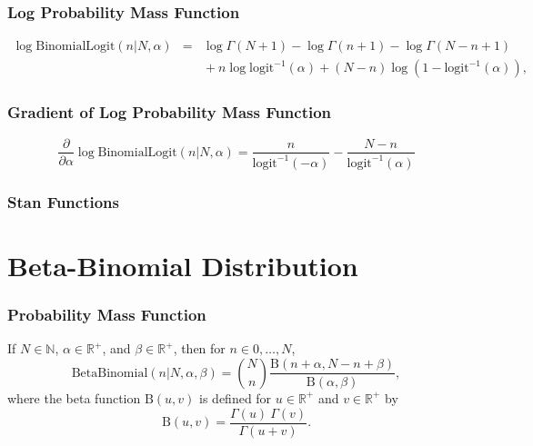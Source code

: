 \begin{description}
\subsubsection{Log Probability Mass Function}

\begin{eqnarray*} \log \text{BinomialLogit}(n|N,\alpha) & = & \log \Gamma(N+1) - \log \Gamma(n + 1) - \log \Gamma(N- n + 1) \\[4pt]   & &  { } + n \log \text{logit}^{-1}(\alpha) + (N - n) \log \left( 1 -   \text{logit}^{-1}(\alpha) \right), \end{eqnarray*}


\subsubsection{Gradient of Log Probability Mass Function}

 \[ \frac{\partial}{\partial \alpha} \log \text{BinomialLogit}(n|N,\alpha) = \frac{n}{\text{logit}^{-1}(-\alpha)} - \frac{N - n}{\text{logit}^{-1}(\alpha)} \] 



\subsubsection{Stan Functions}


\begin{description}    \end{description}


\section{Beta-Binomial Distribution}


\subsubsection{Probability Mass Function}


If $N \in \mathbb{N}$, $\alpha \in \mathbb{R}^+$, and $\beta \in \mathbb{R}^+$, then for $n \in {0,\ldots,N}$, \[ \text{BetaBinomial}(n|N,\alpha,\beta) = \binom{N}{n} \frac{\mathrm{B}(n+\alpha, N -n +   \beta)}{\mathrm{B}(\alpha,\beta)}, \] where the beta function $\mathrm{B}(u,v)$ is defined for $u \in \mathbb{R}^+$ and $v \in \mathbb{R}^+$ by \[ \mathrm{B}(u,v) = \frac{\Gamma(u) \ \Gamma(v)}{\Gamma(u + v)}. \] 


\end{description}
